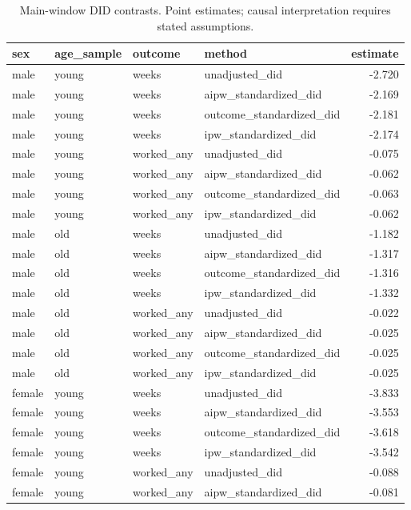 \begin{table}

\caption{Main-window DID contrasts. Point estimates; causal interpretation requires stated assumptions.}
\centering
\begin{tabular}[t]{llllr}
\toprule
sex & age\_sample & outcome & method & estimate\\
\midrule
male & young & weeks & unadjusted\_did & -2.720\\
male & young & weeks & aipw\_standardized\_did & -2.169\\
male & young & weeks & outcome\_standardized\_did & -2.181\\
male & young & weeks & ipw\_standardized\_did & -2.174\\
male & young & worked\_any & unadjusted\_did & -0.075\\
\addlinespace
male & young & worked\_any & aipw\_standardized\_did & -0.062\\
male & young & worked\_any & outcome\_standardized\_did & -0.063\\
male & young & worked\_any & ipw\_standardized\_did & -0.062\\
male & old & weeks & unadjusted\_did & -1.182\\
male & old & weeks & aipw\_standardized\_did & -1.317\\
\addlinespace
male & old & weeks & outcome\_standardized\_did & -1.316\\
male & old & weeks & ipw\_standardized\_did & -1.332\\
male & old & worked\_any & unadjusted\_did & -0.022\\
male & old & worked\_any & aipw\_standardized\_did & -0.025\\
male & old & worked\_any & outcome\_standardized\_did & -0.025\\
\addlinespace
male & old & worked\_any & ipw\_standardized\_did & -0.025\\
female & young & weeks & unadjusted\_did & -3.833\\
female & young & weeks & aipw\_standardized\_did & -3.553\\
female & young & weeks & outcome\_standardized\_did & -3.618\\
female & young & weeks & ipw\_standardized\_did & -3.542\\
\addlinespace
female & young & worked\_any & unadjusted\_did & -0.088\\
female & young & worked\_any & aipw\_standardized\_did & -0.081\\

\end{tabular}
\end{table}
